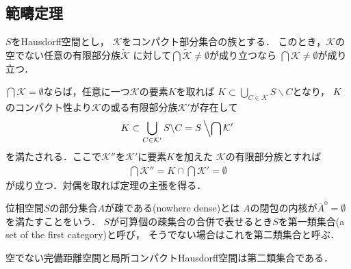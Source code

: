 \subsection{範疇定理}
	\begin{screen}
		\begin{thm}[Cantorの共通部分定理]\label{thm:Cantor_intersection_theorem}
			$S$をHausdorff空間とし，
			$\mathcal{K}$をコンパクト部分集合の族とする．
			このとき，$\mathcal{K}$の空でない任意の有限部分族$\tilde{\mathcal{K}}$
			に対して$\bigcap \tilde{\mathcal{K}} \neq \emptyset$が成り立つなら
			$\bigcap \mathcal{K} \neq \emptyset$が成り立つ．
		\end{thm}
	\end{screen}
	
	\begin{prf}
		$\bigcap \mathcal{K} = \emptyset$ならば，任意に一つ$\mathcal{K}$の要素$K$を取れば
		$K \subset \bigcup_{C \in \mathcal{K}} S \backslash C$となり，
		$K$のコンパクト性より$\mathcal{K}$の或る有限部分族$\mathcal{K}'$が存在して
		\begin{align}
			K \subset \bigcup_{C \in \mathcal{K}'} S \backslash C 
			= S \left\backslash \bigcap \mathcal{K}' \right.
		\end{align}
		を満たされる．ここで$\mathcal{K}''$を$\mathcal{K}'$に要素$K$を加えた
		$\mathcal{K}$の有限部分族とすれば
		\begin{align}
			\bigcap \mathcal{K}'' = K \cap \bigcap \mathcal{K}' = \emptyset
		\end{align}
		が成り立つ．対偶を取れば定理の主張を得る．
		\QED
	\end{prf}
	
	\begin{screen}
		\begin{dfn}
			位相空間$S$の部分集合$A$が疎である(nowhere dense)とは
			$A$の閉包の内核が$\overline{A}^{\mathrm{o}} = \emptyset$を満たすことをいう．
			$S$が可算個の疎集合の合併で表せるとき$S$を第一類集合(a set of the first category)と呼び，
			そうでない場合はこれを第二類集合と呼ぶ．
		\end{dfn}
	\end{screen}
	
	\begin{screen}
		\begin{thm}[Baireの範疇定理]\label{thm:Baire_category_theorem}
			空でない完備距離空間と局所コンパクトHausdorff空間は第二類集合である．
		\end{thm}
	\end{screen}
	
